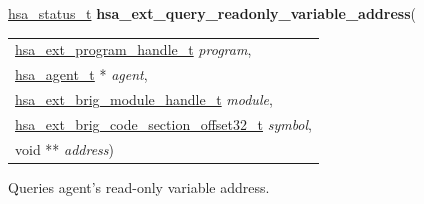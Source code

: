 \documentclass[final]{book}
\newcommand{\hsaarg}[1]{\textit{#1}}
\begin{document}
\noindent\begin{tcolorbox}[breakable,nobeforeafter,colframe=white,colback=lightgray,left=0mm]
\hyperlink{group__status_1gad755322e7ff95456520e8abdbe90d225}{hsa_status_t} \hypertarget{group__HsailLinkerServiceLayer_1ga3fae56afd44ba060fa9324c76865485b}{\textbf{hsa_ext_query_readonly_variable_address}}(
\vspace{-3.5mm}\begin{longtable}{@{}p{\textwidth}}
\hspace{1.7em}\hyperlink{group__HsailLinkerServiceLayer_1gaea8d90863414407ddba7e318db7412f9}{hsa_ext_program_handle_t} \hsaarg{program},\\
\hspace{1.7em}\hyperlink{group__topology_1gab8db3fb886332a24acac08ec361e1d86}{hsa_agent_t} * \hsaarg{agent},\\
\hspace{1.7em}\hyperlink{group__FinalizerCoreApi_1ga0216996f5341a8591ecf9e0f6fd1b7e5}{hsa_ext_brig_module_handle_t} \hsaarg{module},\\
\hspace{1.7em}\hyperlink{group__FinalizerCoreApi_1ga494b8ac14a8c10af95b83b51a8a4ad7f}{hsa_ext_brig_code_section_offset32_t} \hsaarg{symbol},\\
\hspace{1.7em}void ** \hsaarg{address})\end{longtable}

\end{tcolorbox}
Queries agent's read-only variable address.
\end{document}
